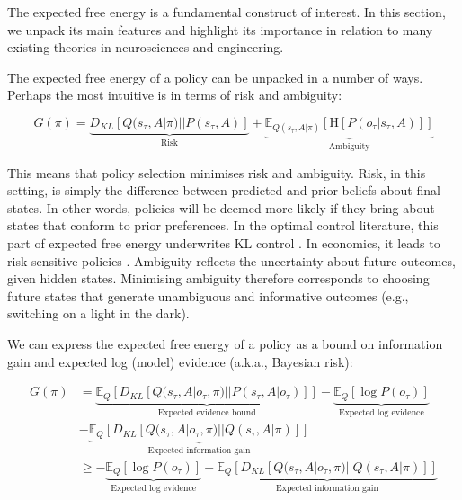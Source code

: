 \documentclass[review,12pt,authoryear]{elsarticle}
\begin{document}
The expected free energy is a fundamental construct of interest. In this section, we unpack its main features and highlight its importance in relation to many existing theories in neurosciences and engineering.

The expected free energy of a policy can be unpacked in a number of ways. Perhaps the most intuitive is in terms of risk and ambiguity:

\begin{equation}
    G(\pi) = \underbrace{D_{KL}[Q(s_\tau, A|\pi)||P(s_\tau, A)]}_{\text{Risk}}+ \underbrace{\mathbb E_{Q(s_\tau, A|\pi)}[\text{H} [ P(o_\tau |s_\tau, A)]]}_{\text{Ambiguity}}
\end{equation}

This means that policy selection minimises risk and ambiguity. Risk, in this setting, is simply the difference between predicted and prior beliefs about final states. In other words, policies will be deemed more likely if they bring about states that conform to prior preferences. In the optimal control literature, this part of expected free energy underwrites KL control \citep{todorovGeneralDualityOptimal2008,vandenbroekRiskSensitivePath2010}. In economics, it leads to risk sensitive policies \citep{flemingRisksensitiveControlOptimal2002}. Ambiguity reflects the uncertainty about future outcomes, given hidden states. Minimising ambiguity therefore corresponds to choosing future states that generate unambiguous and informative outcomes (e.g., switching on a light in the dark).

We can express the expected free energy of a policy as a bound on information gain and expected log (model) evidence (a.k.a., Bayesian risk): 

\begin{equation}
\label{eq: efe inf gain exp log evidence}
    \begin{split}
        G(\pi)
        &= \underbrace{\mathbb E_Q[D_{KL}[Q(s_\tau, A|o_\tau, \pi)||P(s_\tau, A|o_\tau)]]}_{\text{Expected evidence bound}}- \underbrace{\mathbb E_Q[\log P(o_\tau)]}_{\text{Expected log evidence}} \\
        &- \underbrace{\mathbb E_Q [D_{KL}[Q(s_\tau,A |o_\tau, \pi)||Q(s_\tau ,A|\pi)]]}_{\text{Expected information gain}} \\
        &\geq - \underbrace{\mathbb E_Q[\log P(o_\tau)]}_{\text{Expected log evidence}}- \underbrace{\mathbb E_Q [D_{KL}[Q(s_\tau,A |o_\tau, \pi)||Q(s_\tau,A |\pi)]]}_{\text{Expected information gain}} 
    \end{split}
\end{equation}
\end{document}

